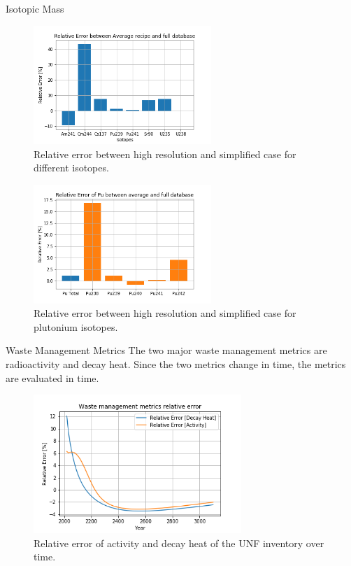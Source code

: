 \documentclass[final]{beamer}
\newlength{\onecolwid}
\newlength{\threecolwid}
\begin{document}
\begin{frame}[t]
\begin{columns}[t,totalwidth=\threecolwid]
\begin{column}{\onecolwid}
\begin{block}{Isotopic Mass}

\begin{figure}
    \centering
    \includegraphics[width=0.6\textwidth]{../images/iso_rel.png}
    \caption{Relative error between high resolution and simplified case for different isotopes.}
    \label{fig:iso_rel}
\end{figure}


\begin{figure}
    \centering
    \includegraphics[width=0.6\textwidth]{../images/pu_rel.png}
    \caption{Relative error between high resolution and simplified case for plutonium isotopes.}
    \label{fig:pu_rel}
\end{figure}
\end{block}


\begin{block}{Waste Management Metrics}
The two major waste management metrics are radioactivity and
decay heat. Since the two metrics change in time, the metrics
are evaluated in time.

\begin{figure}
    \centering
    \includegraphics[width=0.7\textwidth]{../images/ha_err.png}
    \caption{Relative error of activity and decay heat of the
            \gls{UNF} inventory over time.}
    \label{fig:wm_err}
\end{figure}



\end{block}
\end{column}
\end{columns}
\end{frame}
\end{document}
